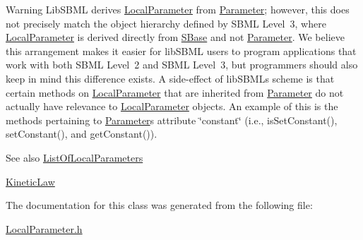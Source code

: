 \begin{DoxyWarning}{Warning}
Lib\+S\+B\+ML derives \hyperlink{class_local_parameter}{Local\+Parameter} from \hyperlink{class_parameter}{Parameter}; however, this does not precisely match the object hierarchy defined by S\+B\+ML Level~3, where \hyperlink{class_local_parameter}{Local\+Parameter} is derived directly from \hyperlink{class_s_base}{S\+Base} and not \hyperlink{class_parameter}{Parameter}. We believe this arrangement makes it easier for lib\+S\+B\+ML users to program applications that work with both S\+B\+ML Level~2 and S\+B\+ML Level~3, but programmers should also keep in mind this difference exists. A side-\/effect of lib\+S\+B\+ML\textquotesingle{}s scheme is that certain methods on \hyperlink{class_local_parameter}{Local\+Parameter} that are inherited from \hyperlink{class_parameter}{Parameter} do not actually have relevance to \hyperlink{class_local_parameter}{Local\+Parameter} objects. An example of this is the methods pertaining to \hyperlink{class_parameter}{Parameter}\textquotesingle{}s attribute \char`\"{}constant\char`\"{} (i.\+e., is\+Set\+Constant(), set\+Constant(), and get\+Constant()).
\end{DoxyWarning}
\begin{DoxySeeAlso}{See also}
\hyperlink{class_list_of_local_parameters}{List\+Of\+Local\+Parameters} 

\hyperlink{class_kinetic_law}{Kinetic\+Law} 
\end{DoxySeeAlso}


The documentation for this class was generated from the following file\+:\begin{DoxyCompactItemize}
\item 
\hyperlink{_local_parameter_8h}{Local\+Parameter.\+h}\end{DoxyCompactItemize}
